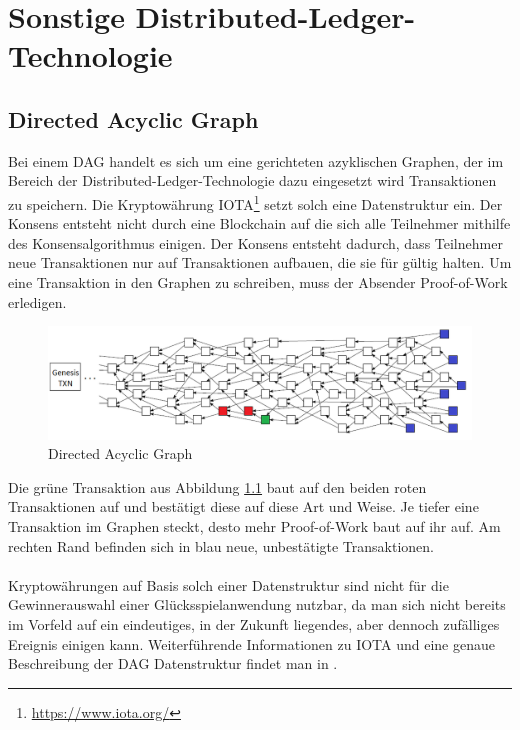 \chapter{Sonstige Distributed-Ledger-Technologie}
\section{Directed Acyclic Graph}
Bei einem DAG handelt es sich um eine gerichteten azyklischen Graphen, der im Bereich der  Distributed-Ledger-Technologie dazu eingesetzt wird Transaktionen zu speichern.
Die Kryptowährung IOTA\footnote{\url{https://www.iota.org/}} setzt solch eine Datenstruktur ein. Der Konsens entsteht nicht durch eine Blockchain auf die sich alle Teilnehmer mithilfe des Konsensalgorithmus einigen. Der Konsens entsteht dadurch, dass Teilnehmer neue Transaktionen nur auf Transaktionen aufbauen, die sie für gültig halten. Um eine Transaktion in den Graphen zu schreiben, muss der Absender Proof-of-Work erledigen.

\begin{figure}[H]
\centering
\includegraphics[width=1\linewidth]{Figures/tangle}
\decoRule
\caption{Directed Acyclic Graph}
\label{fig:tangle}
\end{figure}

Die grüne Transaktion aus Abbildung \ref{fig:tangle} baut auf den beiden roten Transaktionen auf und bestätigt diese auf diese Art und Weise. Je tiefer eine Transaktion im Graphen steckt, desto mehr Proof-of-Work baut auf ihr auf. Am rechten Rand befinden sich in blau neue, unbestätigte Transaktionen.\\\\
Kryptowährungen auf Basis solch einer Datenstruktur sind nicht für die Gewinnerauswahl einer Glücksspielanwendung nutzbar, da man sich nicht bereits im Vorfeld auf ein eindeutiges, in der Zukunft liegendes, aber dennoch zufälliges Ereignis einigen kann. Weiterführende Informationen zu IOTA und eine genaue Beschreibung der DAG Datenstruktur findet man in \cite{tangle_whitepaper}.


